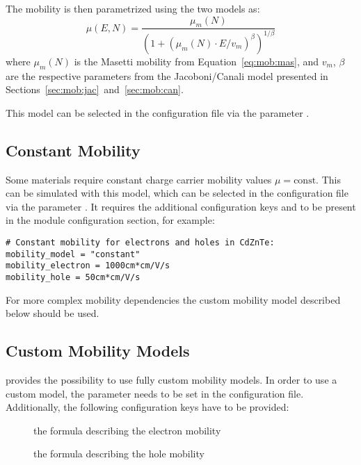 The mobility is then parametrized using the two models as:
\begin{equation}
    \label{eq:mob:mascan}
    \mu (E, N) = \frac{\mu_{m}(N)}{\left(1 + \left(\mu_{m}(N) \cdot E / v_{m} \right)^{\beta} \right)^{1 / \beta}}
\end{equation}
where $\mu_{m}(N)$ is the Masetti mobility from Equation~\eqref{eq:mob:mas}, and $v_{m}$, $\beta$ are the respective parameters from the Jacoboni/Canali model presented in Sections~\ref{sec:mob:jac}~and~\ref{sec:mob:can}.

This model can be selected in the configuration file via the parameter .

\subsection{Constant Mobility}

Some materials require constant charge carrier mobility values $\mu = \textrm{const}$.
This can be simulated with this model, which can be selected in the configuration file via the parameter .
It requires the additional configuration keys  and  to be present in the module configuration section, for example:

\begin{verbatim}
# Constant mobility for electrons and holes in CdZnTe:
mobility_model = "constant"
mobility_electron = 1000cm*cm/V/s
mobility_hole = 50cm*cm/V/s
\end{verbatim}

For more complex mobility dependencies the custom mobility model described below should be used.

\subsection{Custom Mobility Models}
\apsq provides the possibility to use fully custom mobility models.
In order to use a custom model, the parameter  needs to be set in the configuration file.
Additionally, the following configuration keys have to be provided:
\begin{description}
    \item[] the formula describing the electron mobility
    \item[] the formula describing the hole mobility
\end{description}

